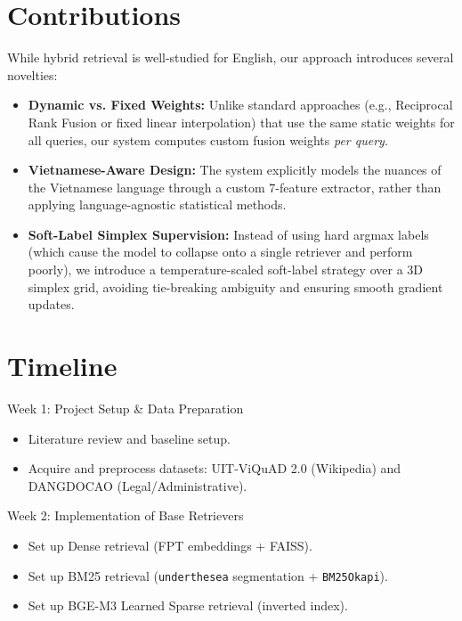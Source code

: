 \documentclass[11pt,a4paper]{article}
\begin{document}
\section{Contributions}
While hybrid retrieval is well-studied for English, our approach introduces several novelties:
\begin{itemize}[leftmargin=*]
    \item \textbf{Dynamic vs. Fixed Weights:} Unlike standard approaches (e.g., Reciprocal Rank Fusion or fixed linear interpolation) that use the same static weights for all queries, our system computes custom fusion weights \emph{per query}.
    \item \textbf{Vietnamese-Aware Design:} The system explicitly models the nuances of the Vietnamese language through a custom 7-feature extractor, rather than applying language-agnostic statistical methods.
    \item \textbf{Soft-Label Simplex Supervision:} Instead of using hard argmax labels (which cause the model to collapse onto a single retriever and perform poorly), we introduce a temperature-scaled soft-label strategy over a 3D simplex grid, avoiding tie-breaking ambiguity and ensuring smooth gradient updates.
\end{itemize}

\section{Timeline}

\begin{timelinebox}{Week 1: Project Setup \& Data Preparation}
\begin{itemize}[leftmargin=*,nosep]
    \item Literature review and baseline setup.
    \item Acquire and preprocess datasets: UIT-ViQuAD 2.0 (Wikipedia) and DANGDOCAO (Legal/Administrative).
\end{itemize}
\end{timelinebox}

\begin{timelinebox}{Week 2: Implementation of Base Retrievers}
\begin{itemize}[leftmargin=*,nosep]
    \item Set up Dense retrieval (FPT embeddings + FAISS).
    \item Set up BM25 retrieval (\texttt{underthesea} segmentation + \texttt{BM25Okapi}).
    \item Set up BGE-M3 Learned Sparse retrieval (inverted index).
\end{itemize}
\end{timelinebox}
\end{document}
